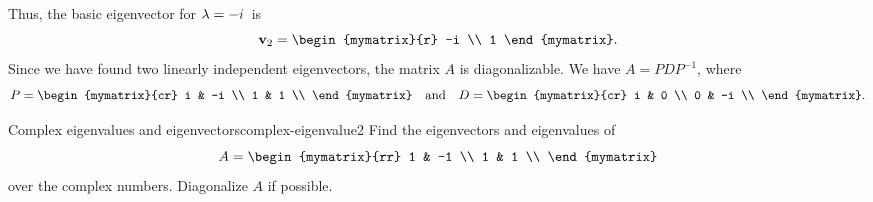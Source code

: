 \begin{solution}
\begin{equation*}
  \end{equation*}
  Thus, the basic eigenvector for $\lambda=-i$\, is
  \begin{equation*}
    \vect{v}_2 = \begin{mymatrix}{r} -i \\ 1 \end{mymatrix}.
  \end{equation*}
  Since we have found two linearly independent eigenvectors, the
  matrix $A$ is diagonalizable. We have $A=PDP^{-1}$, where
  \begin{equation*}
    P =
    \begin{mymatrix}{cr}
      i & -i \\
      1 &  1 \\
    \end{mymatrix}
    \quad\mbox{and}\quad
    D =
    \begin{mymatrix}{cr}
      i &  0 \\
      0 & -i \\
    \end{mymatrix}.
  \end{equation*}
\end{solution}

\begin{example}{Complex eigenvalues and eigenvectors}{complex-eigenvalue2}
  Find the eigenvectors and eigenvalues of
  \begin{equation*}
    A=\begin{mymatrix}{rr}
      1 & -1 \\
      1 &  1 \\
    \end{mymatrix}
  \end{equation*}
  over the complex numbers. Diagonalize $A$ if possible.
\end{example}

